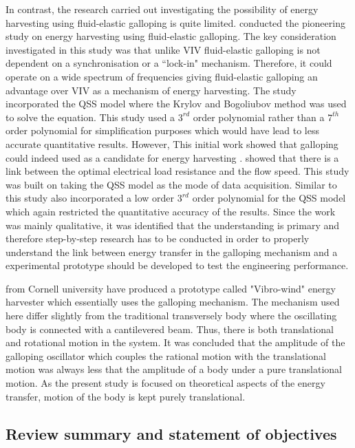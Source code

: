 In contrast, the research carried out investigating the possibility of energy harvesting using fluid-elastic galloping is quite limited. \citet{Barrero-Gil2010a} conducted the pioneering study on energy harvesting using fluid-elastic galloping. The key consideration investigated in this study was that unlike VIV fluid-elastic galloping is not dependent on a synchronisation or a ``lock-in" mechanism. Therefore, it could operate on a wide spectrum of frequencies giving fluid-elastic galloping an advantage over VIV as a mechanism of energy harvesting. The study incorporated the QSS model where the Krylov and Bogoliubov method was used to solve the equation. This study used a $3^{rd}$ order polynomial rather than a $7^{th}$ order polynomial for simplification purposes which would have lead to less accurate quantitative results. However, This initial work showed that galloping could indeed used as a candidate for energy harvesting .\citet{vicente-Ludlam2014} showed that there is a link between the optimal electrical load resistance and the flow speed. This study was built on \citet{Barrero-Gil2010a} taking the QSS model as the mode of data acquisition. Similar to \citet{Barrero-Gil2010a} this study also incorporated a low order $3^{rd}$ order polynomial for the QSS model which again restricted the quantitative accuracy of the results. Since the work was mainly qualitative, it was identified that the understanding is primary and therefore step-by-step research has to be conducted in order to properly understand the link between energy transfer in the galloping mechanism and a experimental prototype should be developed to test the engineering performance. 

\citet{Kluger2013} from Cornell university have produced a prototype called "Vibro-wind" energy harvester which essentially uses the galloping mechanism. The mechanism used here differ slightly from the traditional transversely body where the oscillating body is connected with a cantilevered beam. Thus, there is both translational and rotational motion in the system. It was concluded that the amplitude of the galloping oscillator which couples the rational motion with the translational motion was always less that the amplitude of a body under a pure translational motion. As the present study is focused on theoretical aspects of the energy transfer, motion of the body is kept purely translational.   


\subsection{Review summary and statement of objectives}

